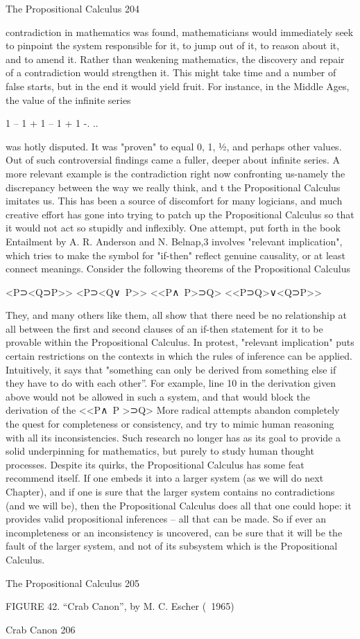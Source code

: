 The Propositional Calculus                                                               204

contradiction in mathematics was found, mathematicians would immediately seek to
pinpoint the system responsible for it, to jump out of it, to reason about it, and to amend
it. Rather than weakening mathematics, the discovery and repair of a contradiction would
strengthen it. This might take time and a number of false starts, but in the end it would
yield fruit. For instance, in the Middle Ages, the value of the infinite series

       1 – 1 + 1 – 1 + 1 -. ..

was hotly disputed. It was "proven" to equal 0, 1, ½, and perhaps other values. Out of
such controversial findings came a fuller, deeper about infinite series.
        A more relevant example is the contradiction right now confronting us-namely the
discrepancy between the way we really think, and t the Propositional Calculus imitates
us. This has been a source of discomfort for many logicians, and much creative effort has
gone into trying to patch up the Propositional Calculus so that it would not act so stupidly
and inflexibly. One attempt, put forth in the book Entailment by A. R. Anderson and N.
Belnap,3 involves "relevant implication", which tries to make the symbol for "if-then"
reflect genuine causality, or at least connect meanings. Consider the following theorems
of the Propositional Calculus

                                         <P⊃<Q⊃P>>
                                         <P⊃<Q∨~P>>
                                         <<P∧~P>⊃Q>
                                       <<P⊃Q>∨<Q⊃P>>


They, and many others like them, all show that there need be no relationship at all
between the first and second clauses of an if-then statement for it to be provable within
the Propositional Calculus. In protest, "relevant implication" puts certain restrictions on
the contexts in which the rules of inference can be applied. Intuitively, it says that
"something can only be derived from something else if they have to do with each other”.
For example, line 10 in the derivation given above would not be allowed in such a
system, and that would block the derivation of the <<P∧~P >⊃Q>
        More radical attempts abandon completely the quest for completeness or
consistency, and try to mimic human reasoning with all its inconsistencies. Such research
no longer has as its goal to provide a solid underpinning for mathematics, but purely to
study human thought processes.
        Despite its quirks, the Propositional Calculus has some feat recommend itself. If
one embeds it into a larger system (as we will do next Chapter), and if one is sure that the
larger system contains no contradictions (and we will be), then the Propositional Calculus
does all that one could hope: it provides valid propositional inferences -- all that can be
made. So if ever an incompleteness or an inconsistency is uncovered, can be sure that it
will be the fault of the larger system, and not of its subsystem which is the Propositional
Calculus.




The Propositional Calculus                                                              205

             FIGURE 42. “Crab Canon”, by M. C. Escher (~1965)




Crab Canon                                                      206

